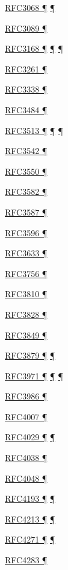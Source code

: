 \documentclass[
]{article}
\begin{document}
\hyperref[why-ipv6-is-so-complicated]{RFC3068 ¶}
\hyperref[obsolete-techniques]{¶}

\hyperref[obsolete-techniques]{RFC3089 ¶}

\hyperref[packet-format]{RFC3168 ¶}
\hyperref[traffic-class-and-flow-label]{¶}
\hyperref[transport-protocols]{¶}

\hyperref[transport-protocols]{RFC3261 ¶}

\hyperref[obsolete-techniques]{RFC3338 ¶}

\hyperref[source-and-destination-address-selection]{RFC3484 ¶}

\hyperref[why-ipv6-is-so-complicated]{RFC3513 ¶}
\hyperref[obsolete-features-in-ipv6]{¶} \hyperref[markdown-usage]{¶}

\hyperref[dual-stack-scenarios]{RFC3542 ¶}

\hyperref[transport-protocols]{RFC3550 ¶}

\hyperref[multihoming]{RFC3582 ¶}

\hyperref[addresses]{RFC3587 ¶}

\hyperref[dns]{RFC3596 ¶}

\hyperref[managed-configuration]{RFC3633 ¶}

\hyperref[layer-2-considerations]{RFC3756 ¶}

\hyperref[address-resolution]{RFC3810 ¶}

\hyperref[transport-protocols]{RFC3828 ¶}

\hyperref[addresses]{RFC3849 ¶}

\hyperref[addresses]{RFC3879 ¶} \hyperref[obsolete-features-in-ipv6]{¶}

\hyperref[security]{RFC3971 ¶} \hyperref[layer-2-considerations]{¶}
\hyperref[obsolete-features-in-ipv6]{¶}

\hyperref[addresses]{RFC3986 ¶}

\hyperref[addresses]{RFC4007 ¶}

\hyperref[layer-2-functions]{RFC4029 ¶} \hyperref[tunnels]{¶}

\hyperref[addresses]{RFC4038 ¶}

\hyperref[addresses]{RFC4048 ¶}

\hyperref[filtering]{RFC4193 ¶} \hyperref[multihoming]{¶}

\hyperref[dual-stack-scenarios]{RFC4213 ¶} \hyperref[tunnels]{¶}

\hyperref[routing]{RFC4271 ¶} \hyperref[routing-operation]{¶}

\hyperref[obsolete-features-in-ipv6]{RFC4283 ¶}
\end{document}
